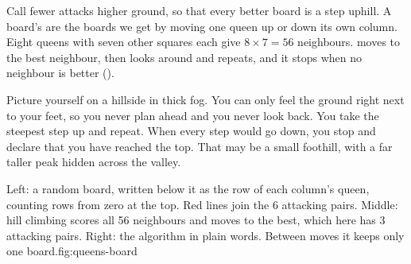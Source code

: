 Call fewer attacks higher ground, so that every better board is a step uphill. A board's  are the boards we get by moving one queen up or down its own column. Eight queens with seven other squares each give $8\times7=56$ neighbours.  moves to the best neighbour, then looks around and repeats, and it stops when no neighbour is better ().

\begin{analogy}
Picture yourself on a hillside in thick fog. You can only feel the ground right next to your feet, so you never plan ahead and you never look back. You take the steepest step up and repeat. When every step would go down, you stop and declare that you have reached the top. That may be a small foothill, with a far taller peak hidden across the valley.
\end{analogy}

\begin{utpfig}{Left: a random board, written below it as the row of each column's queen, counting rows from zero at the top. Red lines join the 6 attacking pairs. Middle: hill climbing scores all 56 neighbours and moves to the best, which here has 3 attacking pairs. Right: the algorithm in plain words. Between moves it keeps only one board.}{fig:queens-board}
\end{utpfig}

